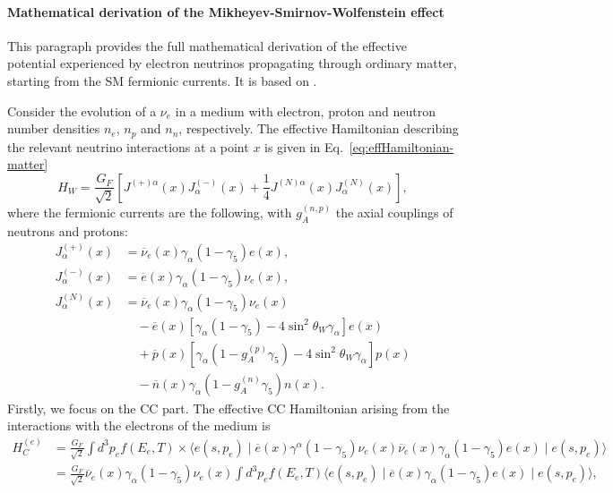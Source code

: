 \paragraph{Mathematical derivation of the Mikheyev-Smirnov-Wolfenstein effect}
\label{par:MSW_derivation}
This paragraph provides the full mathematical derivation of the effective potential experienced by electron neutrinos propagating through ordinary matter, starting from the \ac{SM} fermionic currents. It is based on \cite{neutrinosPDG}.

Consider the evolution of a $\nu_e$ in a medium with electron, proton and neutron number densities $n_e$, $n_p$ and $n_n$, respectively. The effective Hamiltonian describing the relevant neutrino interactions at a point $x$ is given in Eq.~\ref{eq:effHamiltonian-matter}
\begin{equation}
    \label{eq:effHamiltonian-matter}
    H_W = \frac{G_F}{\sqrt{2}} \left[ J^{(+)\alpha}(x) J^{(-)}_\alpha(x) + \frac{1}{4} J^{(N)\alpha}(x) J^{(N)}_\alpha(x) \right],
\end{equation}
where the fermionic currents are the following, with $g_A^{(n, p)}$ the axial couplings of neutrons and protons:
\begin{equation}
    \label{eq:fermionic-currents}
    \begin{aligned}
        J^{(+)}_\alpha(x) &= \overline{\nu}_e(x) \gamma_\alpha (1 - \gamma_5) e(x), \\
        J^{(-)}_\alpha(x) &= \overline{e}(x) \gamma_\alpha (1 - \gamma_5) \nu_e(x), \\
        J^{(N)}_\alpha(x) &= \overline{\nu}_e(x) \gamma_\alpha (1 - \gamma_5) \nu_e(x) \\
        &\quad - \overline{e}(x) \left[ \gamma_\alpha(1 - \gamma_5) - 4\sin^2\theta_W \gamma_\alpha \right] e(x) \\
        &\quad + \overline{p}(x) \left[ \gamma_\alpha(1 - g_A^{(p)}\gamma_5) - 4\sin^2\theta_W \gamma_\alpha \right] p(x) \\
        &\quad - \overline{n}(x) \gamma_\alpha (1 - g_A^{(n)}\gamma_5) n(x).
    \end{aligned}
\end{equation}
Firstly, we focus on the \ac{CC} part. The effective \ac{CC} Hamiltonian arising from the interactions with the electrons of the medium is
\begin{equation}
    \label{eq:H_C_e_1}
    \begin{aligned}
        H_C^{(e)} &= \frac{G_F}{\sqrt{2}} \int d^3p_e f(E_e, T) \times \boldsymbol{\Big\langle} e(s, p_e) \mid \overline{e}(x)\gamma^\alpha(1 - \gamma_5)\nu_e(x) \overline{\nu}_e(x)\gamma_\alpha(1 - \gamma_5)e(x) \mid e(s, p_e)\boldsymbol{\Big\rangle} \\
        &= \frac{G_F}{\sqrt{2}} \overline{\nu}_e(x)\gamma_\alpha(1 - \gamma_5)\nu_e(x) \int d^3p_e f(E_e, T) \boldsymbol{\Big\langle} e(s, p_e) \mid \overline{e}(x)\gamma_\alpha(1 - \gamma_5)e(x) \mid e(s, p_e)\boldsymbol{\Big\rangle},
    \end{aligned}
\end{equation}
